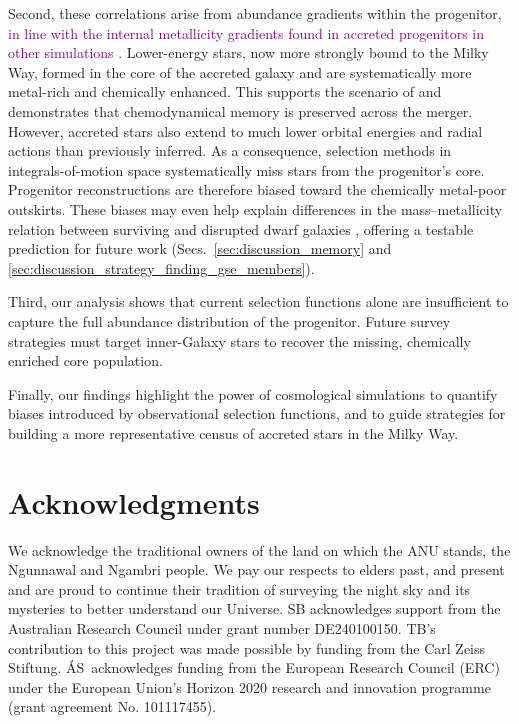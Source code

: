\documentclass[fleqn,usenatbib]{mnras}
\newcommand{\changed}[1]{{\textcolor{purple}{#1}}}
\begin{document}
Second, these correlations arise from abundance gradients within the progenitor\changed{, in line with the internal metallicity gradients found in accreted progenitors in other simulations \citet{Khoperskov2023c, Carrillo2025}}. Lower-energy stars, now more strongly bound to the Milky Way, formed in the core of the accreted galaxy and are systematically more metal-rich and chemically enhanced. This supports the scenario of \citet{Skuladottir2025} and demonstrates that chemodynamical memory is preserved across the merger. However, accreted stars also extend to much lower orbital energies and radial actions than previously inferred. As a consequence, selection methods in integrals-of-motion space \citep{Helmi2018, Feuillet2021, Monty2024} systematically miss stars from the progenitor’s core. Progenitor reconstructions are therefore biased toward the chemically metal-poor outskirts. These biases may even help explain differences in the mass–metallicity relation between surviving and disrupted dwarf galaxies \citep{Naidu2022}, offering a testable prediction for future work (Secs.~\ref{sec:discussion_memory} and \ref{sec:discussion_strategy_finding_gse_members}).

Third, our analysis shows that current selection functions alone are insufficient to capture the full abundance distribution of the progenitor. Future survey strategies must target inner-Galaxy stars to recover the missing, chemically enriched core population.

Finally, our findings highlight the power of cosmological simulations to quantify biases introduced by observational selection functions, and to guide strategies for building a more representative census of accreted stars in the Milky Way.

\section*{Acknowledgments}

We acknowledge the traditional owners of the land on which the ANU stands, the Ngunnawal and Ngambri people. We pay our respects to elders past, and present and are proud to continue their tradition of surveying the night sky and its mysteries to better understand our Universe. SB acknowledges support from the Australian Research Council under grant number DE240100150.
TB's contribution to this project was made possible by funding from the Carl Zeiss Stiftung. \'{A}S~acknowledges funding from the European Research Council (ERC) under the European Union’s Horizon 2020 research and innovation programme (grant agreement No. 101117455).
\end{document}
